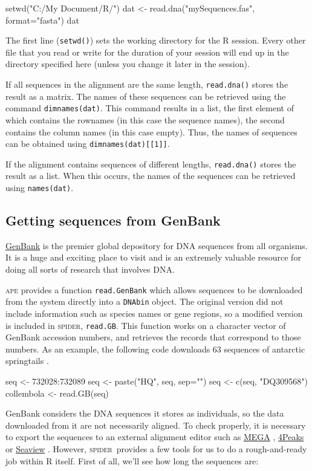 \documentclass{article}
\newcommand{\spider}{\textsc{spider}~} %
\newcommand{\Spider}{\textsc{spider}} %
\newcommand{\progname}[1]{\textsc{#1}}
\newcommand{\fun}[1]{\texttt{#1}}
\begin{document}
\begin{console}
setwd("C:/My Document/R/")
dat <- read.dna("mySequences.fas", format="fasta")
dat
\end{console}

The first line (\fun{setwd()}) sets the working directory for the \progname{R} session. Every other file that you read or write for the duration of your session will end up in the directory specified here (unless you change it later in the session).

If all sequences in the alignment are the same length, \fun{read.dna()} stores the result as a matrix. The names of these sequences can be retrieved using the command \fun{dimnames(dat)}. This command results in a list, the first element of which contains the rownames (in this case the sequence names), the second contains the column names (in this case empty). Thus, the names of sequences can be obtained using \fun{dimnames(dat)[[1]]}.

If the alignment contains sequences of different lengths, \fun{read.dna()} stores the result as a list. When this occurs, the names of the sequences can be retrieved using \fun{names(dat)}. 

\subsection{Getting sequences from GenBank}
\href{http://www.ncbi.nlm.nih.gov/nuccore}{GenBank} is the premier global depository for DNA sequences from all organisms. It is a huge and exciting place to visit and is an extremely valuable resource for doing all sorts of research that involves DNA. 

\progname{ape} provides a function \fun{read.GenBank} which allows sequences to be downloaded from the system directly into a \fun{DNAbin} object. The original version did not include information such as species names or gene regions, so a modified version is included in \Spider, \fun{read.GB}. This function works on a character vector of GenBank accession numbers, and retrieves the records that correspond to those numbers. As an example, the following code downloads 63 sequences of antarctic springtails \citep{Green.etal.2011}.

\begin{console}
seq <- 732028:732089
seq <- paste("HQ", seq, sep="")
seq <- c(seq, "DQ309568")
collembola <- read.GB(seq)
\end{console}

GenBank considers the DNA sequences it stores as individuals, so the data downloaded from it are not necessarily aligned. To check properly, it is necessary to export the sequences to an external alignment editor such as \href{http://www.megasoftware.net}{MEGA} \citep{SW.Tamu.etal.2011.MEGA}, \href{http://www.mekentosj.com/science/4peaks}{4Peaks} or \href{http://pbil.univ-lyon1.fr/software/seaview.html}{Seaview} \citep{SW.Guoy.etal.2010.SeaView}. However,  \spider provides a few tools for us to do a rough-and-ready job within \progname{R} itself. First of all, we'll see how long the sequences are:
\end{document}

